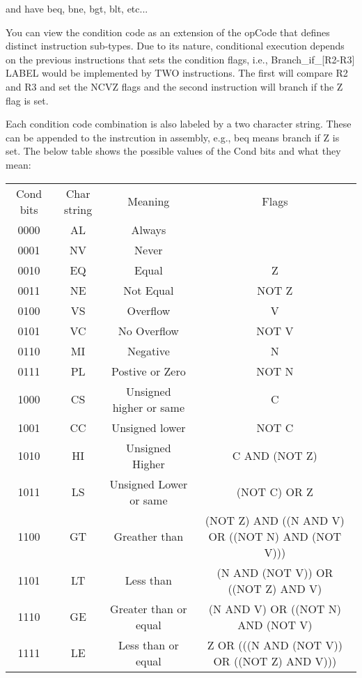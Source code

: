 \documentclass[]{article}
\begin{document}
\noindent and have beq, bne, bgt, blt, etc...

\noindent You can view the condition code as an extension of the opCode that defines distinct instruction sub-types.  Due to its nature, conditional execution depends on the previous instructions that sets the condition flags, i.e., Branch\_if\_[R2-R3] LABEL would be implemented by TWO instructions.  The first will compare R2 and R3 and set the NCVZ flags and the second instruction will branch if the Z flag is set.

\noindent Each condition code combination is also labeled by a two character string.  These can be appended to the instrcution in assembly, e.g., beq means branch if Z is set.  The below table shows the possible values of the Cond bits and what they mean:
\begin{center}
	\begin{tabular}{|c|c|c|c|}\cline{1-4}
		Cond bits & Char string & Meaning & Flags\\\cline{1-4}\hfill
		0000 & AL & Always & \\\cline{1-4}\hfill
		0001 & NV & Never & \\\cline{1-4}\hfill
		0010 & EQ & Equal & Z\\\cline{1-4}\hfill
		0011 & NE & Not Equal & NOT Z\\\cline{1-4}\hfill
		0100 & VS & Overflow & V\\\cline{1-4}\hfill
		0101 & VC & No Overflow & NOT V\\\cline{1-4}\hfill
		0110 & MI & Negative & N\\\cline{1-4}\hfill
		0111 & PL & Postive or Zero & NOT N \\\cline{1-4}\hfill
		1000 & CS & Unsigned higher or same &  C\\\cline{1-4}\hfill
		1001 & CC & Unsigned lower & NOT C\\\cline{1-4}\hfill
		1010 & HI & Unsigned Higher & C AND (NOT Z)\\\cline{1-4}\hfill
		1011 & LS & Unsigned Lower or same & (NOT C) OR Z\\\cline{1-4}\hfill
		1100 & GT & Greather than & (NOT Z) AND ((N AND V) OR ((NOT N) AND (NOT V)))\\\cline{1-4}\hfill
		1101 & LT & Less than & (N AND (NOT V)) OR ((NOT Z) AND V)\\\cline{1-4}\hfill
		1110 & GE & Greater than or equal & (N AND V) OR ((NOT N) AND (NOT V)\\\cline{1-4}\hfill
		1111 & LE & Less than or equal & Z OR (((N AND (NOT V)) OR ((NOT Z) AND V)))\\\cline{1-4}
	\end{tabular}
\end{center}
\end{document}
